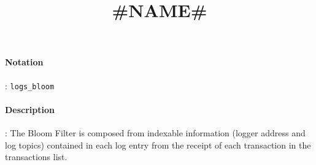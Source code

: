 \documentclass[10pt,a4paper,oneside]{scrartcl}
\author{}
\title{#NAME#}
\date{}
\begin{document}
\maketitle
\paragraph{Notation}: \texttt{logs\_bloom}
\paragraph{Description}: The Bloom Filter is composed from indexable information (logger address and log topics) contained in each log entry from the receipt of each transaction in the transactions list.

\printbibliography
\end{document}
